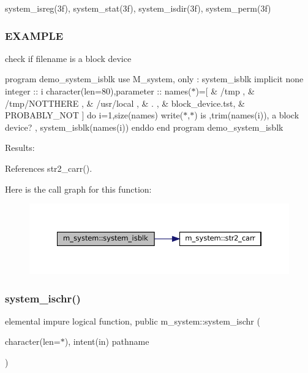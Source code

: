 system\+\_\+isreg(3f), system\+\_\+stat(3f), system\+\_\+isdir(3f), system\+\_\+perm(3f)

\subsubsection*{E\+X\+A\+M\+P\+LE}

check if filename is a block device

program demo\+\_\+system\+\_\+isblk use M\+\_\+system, only \+: system\+\_\+isblk implicit none integer \+:\+: i character(len=80),parameter \+:\+: names($\ast$)=\mbox{[} \& \textquotesingle{}/tmp \textquotesingle{}, \& \textquotesingle{}/tmp/\+N\+O\+T\+T\+H\+E\+RE \textquotesingle{}, \& \textquotesingle{}/usr/local \textquotesingle{}, \& \textquotesingle{}. \textquotesingle{}, \& \textquotesingle{}block\+\_\+device.\+tst\textquotesingle{}, \& \textquotesingle{}P\+R\+O\+B\+A\+B\+L\+Y\+\_\+\+N\+OT \textquotesingle{}\mbox{]} do i=1,size(names) write($\ast$,$\ast$)\textquotesingle{} is \textquotesingle{},trim(names(i)),\textquotesingle{} a block device? \textquotesingle{}, system\+\_\+isblk(names(i)) enddo end program demo\+\_\+system\+\_\+isblk

Results\+: 

References str2\+\_\+carr().

Here is the call graph for this function\+:\nopagebreak
\begin{figure}[H]
\begin{center}
\leavevmode
\includegraphics[width=350pt]{namespacem__system_a1294b8d8b4910261c0a0991bf668ab67_cgraph}
\end{center}
\end{figure}
\mbox{\label{namespacem__system_a49f1d027d438aab86024660b0802768f}} 
\subsubsection{\texorpdfstring{system\+\_\+ischr()}{system\_ischr()}}
{\footnotesize\ttfamily elemental impure logical function, public m\+\_\+system\+::system\+\_\+ischr (\begin{DoxyParamCaption}\item[{character(len=$\ast$), intent(in)}]{pathname }\end{DoxyParamCaption})}



